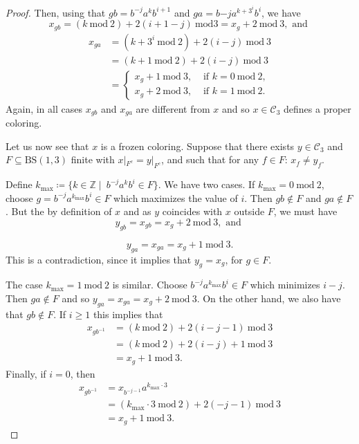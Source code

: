 \documentclass[letterpaper,11pt,reqno]{amsart}
\theoremstyle{plain}
\theoremstyle{definition}
\theoremstyle{cupremark}
\begin{document}
\begin{proof}
	
	Then, using that $gb=b^{-j}a^kb^{i+1}$ and $ga=b{-j}a^{k+3^i}b^{i}$, we have 
	\begin{equation*}
	x_{gb}= (k\ \mathrm{mod}\ 2)+2(i+1-j)\ \mathrm{mod} 3=x_{g}+2\  \mathrm{mod} \ 3, \text{ and }
	\end{equation*}
	\begin{align*}
	x_{ga}&=(k+3^{i}\ \mathrm{mod} \ 2)+ 2(i-j) \ \mathrm{mod}\ 3 \\
	&=(k+1\ \mathrm{mod} \ 2)+ 2(i-j) \ \mathrm{mod}\ 3\\
	&=\left\{\begin{aligned}
	x_{g}+1 \ \mathrm{mod}\ 3, &\text{ if }k=0\ \mathrm{mod}\ 2, \\
	x_{g}+2 \ \mathrm{mod}\ 3, &\text{ if }k=1\ \mathrm{mod}\ 2.
	\end{aligned} \right.
	\end{align*}
	Again, in all cases $x_{gb}$ and $x_{ga}$ are different from $x$ and so $x\in \mathcal{C}_3$ defines a proper coloring.
	
	Let us now see that $x$ is a frozen coloring. Suppose that there exists $y\in \mathcal{C}_3$ and $F\subseteq \mathrm{BS}(1,3)$ finite with $x|_{F^{c}}=y|_{F^{c}}$, and such that for any $f\in F$: $x_f\neq y_f$.
	
	Define $k_{\mathrm{max}}\coloneqq\{ k\in \mathbb{Z}\mid \ b^{-j}a^kb^i\in F \}$. We have two cases. If $k_\mathrm{max}=0\ \mathrm{mod}\ 2$, choose $g=b^{-j}a^{k_{\mathrm{max}}}b^i\in F$ which maximizes the value of $i$. Then $gb\notin F$ and $ga\notin F$. But the by definition of $x$ and as $y$ coincides with $x$ outside $F$, we must have
	$$
	y_{gb}=x_{gb}=x_{g}+2\ \mathrm{mod}\ 3, \text{ and }
	$$
	
	$$
	y_{ga}=x_{ga}=x_{g}+1\ \mathrm{mod}\ 3.
	$$
	This is a contradiction, since it implies that $y_g=x_g$, for $g\in F$.
	
	
	The case $k_{\mathrm{max}}=1\ \mathrm{mod}\ 2$ is similar. Choose $b^{-j}a^{k_\mathrm{max}}b^{i}\in F$ which minimizes $i-j$. Then $ga\not \in F$ and so $y_{ga}=x_{ga}=x_{g}+2\ \mathrm{mod}\ 3$. On the other hand, we also have that $gb\not \in F$.
	If $i\ge 1$ this implies that
	\begin{align*}
	x_{gb^{-1}}&=(k\ \mathrm{mod\ 2})+2(i-j-1)\ \mathrm{mod}\ 3\\
	&=(k\ \mathrm{mod\  2})+2(i-j)+1\ \mathrm{mod}\ 3\\
	&=x_g+1\ \mathrm{mod}\ 3.
	\end{align*}
	Finally, if $i=0$, then 
	\begin{align*}
	x_{gb^{-1}}&=x_{b^{-j-1}}a^{k_{\mathrm{max}}\cdot 3}\\
	&=(k_{\mathrm{max}}\cdot 3 \ \mathrm{mod}\ 2)+2(-j-1)\ \mathrm{mod}\ 3\\
	&=x_g+1\ \mathrm{mod}\ 3.
	\end{align*}
	

\end{proof}
\end{document}
